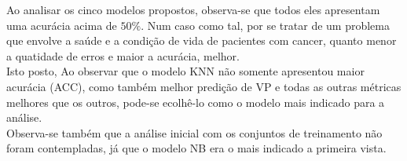 
Ao analisar os cinco modelos propostos, observa-se que todos eles apresentam uma acurácia acima de $50\%$. Num caso como tal, por se tratar de um problema que envolve a saúde e a condição de vida de pacientes com cancer, quanto menor a quatidade de erros e maior a acurácia, melhor.
\\

Isto posto, Ao observar que o modelo KNN não somente apresentou maior acurácia (ACC), como também melhor predição de VP e todas as outras métricas melhores que os outros, pode-se ecolhê-lo como o modelo mais indicado para a análise.\\

Observa-se também que a análise inicial com os conjuntos de treinamento não foram contempladas, já que o modelo NB era o mais indicado a primeira vista.